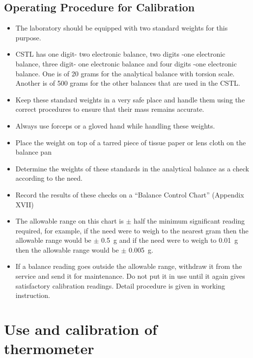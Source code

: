 \documentclass[]{book}
\providecommand{\tightlist}{%
  \setlength{\itemsep}{0pt}\setlength{\parskip}{0pt}}
\begin{document}
\section{Operating Procedure for
Calibration}\label{operating-procedure-for-calibration}

\begin{itemize}
\tightlist
\item
  The laboratory should be equipped with two standard weights for this
  purpose.
\item
  CSTL has one digit- two electronic balance, two digits -one electronic
  balance, three digit- one electronic balance and four digits -one
  electronic balance. One is of 20 grams for the analytical balance with
  torsion scale. Another is of 500 grams for the other balances that are
  used in the CSTL.
\item
  Keep these standard weights in a very safe place and handle them using
  the correct procedures to ensure that their mass remains accurate.
\item
  Always use forceps or a gloved hand while handling these weights.
\item
  Place the weight on top of a tarred piece of tissue paper or lens
  cloth on the balance pan
\item
  Determine the weights of these standards in the analytical balance as
  a check according to the need.
\item
  Record the results of these checks on a ``Balance Control Chart''
  (Appendix XVII)
\item
  The allowable range on this chart is \(\pm\) half the minimum
  significant reading required, for example, if the need were to weigh
  to the nearest gram then the allowable range would be \(\pm\)
  \SI{0.5}{\gram} and if the need were to weigh to \SI{0.01}{\gram} then
  the allowable range would be \(\pm\) \SI{0.005}{\gram}.
\item
  If a balance reading goes outside the allowable range, withdraw it
  from the service and send it for maintenance. Do not put it in use
  until it again gives satisfactory calibration readings. Detail
  procedure is given in working instruction.
\end{itemize}

\chapter{Use and calibration of
thermometer}\label{use-and-calibration-of-thermometer}
\end{document}
